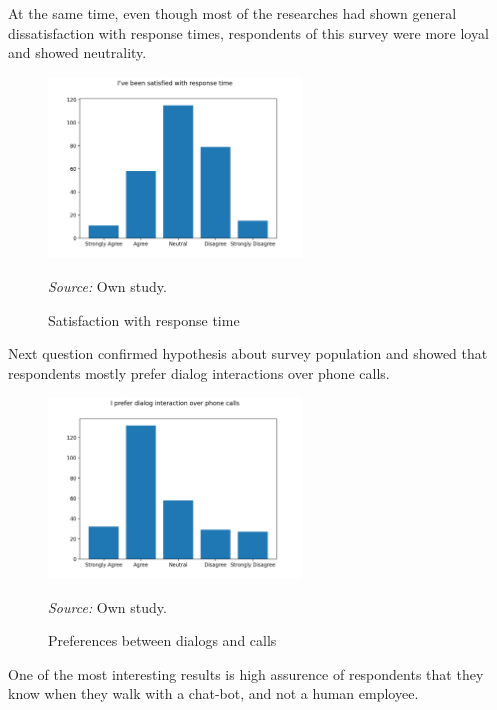 At the same time, even though most of the researches had shown general dissatisfaction with response times, respondents of this survey were more loyal and showed neutrality.

\begin{figure}
    \centering
    \includegraphics[width=0.6\textwidth,height=\textheight,keepaspectratio]{survey/5_i've_been_satisfied_with_response_time.png}
    \caption{Satisfaction with response time}
    \medskip
    \footnotesize\textit{Source:} Own study.
\end{figure}

Next question confirmed hypothesis about survey population and showed that respondents mostly prefer dialog interactions over phone calls.

\begin{figure}
    \centering
    \includegraphics[width=0.6\textwidth,height=\textheight,keepaspectratio]{survey/6_i_prefer_dialog_interaction_over_phone_calls.png}
    \caption{Preferences between dialogs and calls}
    \medskip
    \footnotesize\textit{Source:} Own study.
\end{figure}

One of the most interesting results is high assurence of respondents that they know when they walk with a chat-bot, and not a human employee.

